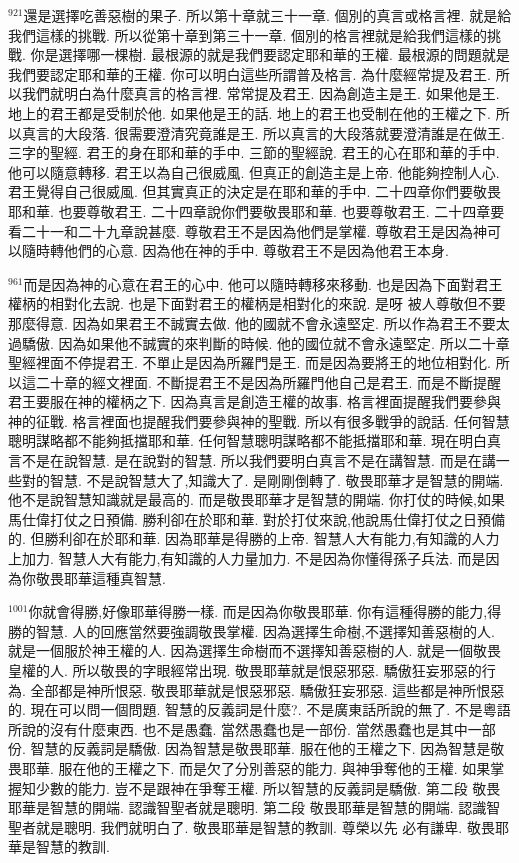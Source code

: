 \documentclass{book}
\begin{document}
$^{921}$還是選擇吃善惡樹的果子.
所以第十章就三十一章.
個別的真言或格言裡.
就是給我們這樣的挑戰.
所以從第十章到第三十一章.
個別的格言裡就是給我們這樣的挑戰.
你是選擇哪一棵樹.
最根源的就是我們要認定耶和華的王權.
最根源的問題就是我們要認定耶和華的王權.
你可以明白這些所謂普及格言.
為什麼經常提及君王.
所以我們就明白為什麼真言的格言裡.
常常提及君王.
因為創造主是王.
如果他是王.
地上的君王都是受制於他.
如果他是王的話.
地上的君王也受制在他的王權之下.
所以真言的大段落.
很需要澄清究竟誰是王.
所以真言的大段落就要澄清誰是在做王.
三字的聖經.
君王的身在耶和華的手中.
三節的聖經說.
君王的心在耶和華的手中.
他可以隨意轉移.
君王以為自己很威風.
但真正的創造主是上帝.
他能夠控制人心.
君王覺得自己很威風.
但其實真正的決定是在耶和華的手中.
二十四章你們要敬畏耶和華.
也要尊敬君王.
二十四章說你們要敬畏耶和華.
也要尊敬君王.
二十四章要看二十一和二十九章說甚麼.
尊敬君王不是因為他們是掌權.
尊敬君王是因為神可以隨時轉他們的心意.
因為他在神的手中.
尊敬君王不是因為他君王本身.

$^{961}$而是因為神的心意在君王的心中.
他可以隨時轉移來移動.
也是因為下面對君王權柄的相對化去說.
也是下面對君王的權柄是相對化的來說.
是呀 被人尊敬但不要那麼得意.
因為如果君王不誠實去做.
他的國就不會永遠堅定.
所以作為君王不要太過驕傲.
因為如果他不誠實的來判斷的時候.
他的國位就不會永遠堅定.
所以二十章聖經裡面不停提君王.
不單止是因為所羅門是王.
而是因為要將王的地位相對化.
所以這二十章的經文裡面.
不斷提君王不是因為所羅門他自己是君王.
而是不斷提醒君王要服在神的權柄之下.
因為真言是創造王權的故事.
格言裡面提醒我們要參與神的征戰.
格言裡面也提醒我們要參與神的聖戰.
所以有很多戰爭的說話.
任何智慧聰明謀略都不能夠抵擋耶和華.
任何智慧聰明謀略都不能抵擋耶和華.
現在明白真言不是在說智慧.
是在說對的智慧.
所以我們要明白真言不是在講智慧.
而是在講一些對的智慧.
不是說智慧大了,知識大了.
是剛剛倒轉了.
敬畏耶華才是智慧的開端.
他不是說智慧知識就是最高的.
而是敬畏耶華才是智慧的開端.
你打仗的時候,如果馬仕偉打仗之日預備.
勝利卻在於耶和華.
對於打仗來說,他說馬仕偉打仗之日預備的.
但勝利卻在於耶和華.
因為耶華是得勝的上帝.
智慧人大有能力,有知識的人力上加力.
智慧人大有能力,有知識的人力量加力.
不是因為你懂得孫子兵法.
而是因為你敬畏耶華這種真智慧.

$^{1001}$你就會得勝,好像耶華得勝一樣.
而是因為你敬畏耶華.
你有這種得勝的能力,得勝的智慧.
人的回應當然要強調敬畏掌權.
因為選擇生命樹,不選擇知善惡樹的人.
就是一個服於神王權的人.
因為選擇生命樹而不選擇知善惡樹的人.
就是一個敬畏皇權的人.
所以敬畏的字眼經常出現.
敬畏耶華就是恨惡邪惡.
驕傲狂妄邪惡的行為.
全部都是神所恨惡.
敬畏耶華就是恨惡邪惡.
驕傲狂妄邪惡.
這些都是神所恨惡的.
現在可以問一個問題.
智慧的反義詞是什麼?.
不是廣東話所說的無了.
不是粵語所說的沒有什麼東西.
也不是愚蠢.
當然愚蠢也是一部份.
當然愚蠢也是其中一部份.
智慧的反義詞是驕傲.
因為智慧是敬畏耶華.
服在他的王權之下.
因為智慧是敬畏耶華.
服在他的王權之下.
而是欠了分別善惡的能力.
與神爭奪他的王權.
如果掌握知少數的能力.
豈不是跟神在爭奪王權.
所以智慧的反義詞是驕傲.
第二段 敬畏耶華是智慧的開端.
認識智聖者就是聰明.
第二段 敬畏耶華是智慧的開端.
認識智聖者就是聰明.
我們就明白了.
敬畏耶華是智慧的教訓.
尊榮以先 必有謙卑.
敬畏耶華是智慧的教訓.
\end{document}
